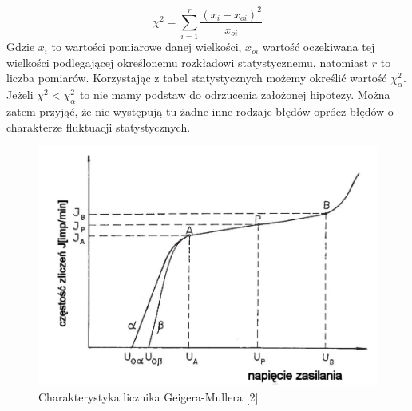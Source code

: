 \documentclass{article}
\begin{document}
\begin{equation}
	\label{chi}
	\chi^2 = \sum_{i=1}^{r}\frac{(x_i - x_{oi})^2}{x_{oi}}
\end{equation}
Gdzie $x_i$ to wartości pomiarowe danej wielkości, $x_{oi}$ wartość oczekiwana tej wielkości podlegającej określonemu rozkładowi statystycznemu, natomiast $r$ to liczba pomiarów. Korzystając z tabel statystycznych możemy określić wartość $\chi^2_\alpha$. Jeżeli $\chi^2 < \chi^2_\alpha$ to nie mamy podstaw do odrzucenia założonej hipotezy. Można zatem przyjąć, że nie występują tu żadne inne rodzaje błędów oprócz błędów o charakterze fluktuacji statystycznych.
\begin{figure}[h!]
	\centering
	
	\includegraphics[width = 0.5\linewidth]{images/charakterystyka}
	\caption{Charakterystyka licznika Geigera-Mullera [2]}
	\label{char}
\end{figure}
\newpage
\end{document}
